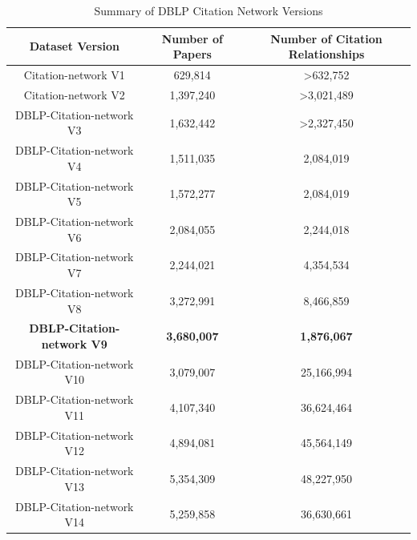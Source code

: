 \documentclass[11pt]{article}
\begin{document}
\begin{table}[h!]
	\centering
	\begin{tabular}{|c|c|c|}
		\hline
		\textbf{Dataset Version}          & \textbf{Number of Papers} & \textbf{Number of Citation Relationships} \\ \hline
		Citation-network V1               & 629,814                   & >632,752                                  \\ \hline
		Citation-network V2               & 1,397,240                 & >3,021,489                                \\ \hline
		DBLP-Citation-network V3          & 1,632,442                 & >2,327,450                                \\ \hline
		DBLP-Citation-network V4          & 1,511,035                 & 2,084,019                                 \\ \hline
		DBLP-Citation-network V5          & 1,572,277                 & 2,084,019                                 \\ \hline
		DBLP-Citation-network V6          & 2,084,055                 & 2,244,018                                 \\ \hline
		DBLP-Citation-network V7          & 2,244,021                 & 4,354,534                                 \\ \hline
		DBLP-Citation-network V8          & 3,272,991                 & 8,466,859                                 \\ \hline
		\textbf{DBLP-Citation-network V9} & \textbf{3,680,007}        & \textbf{1,876,067}                        \\ \hline
		DBLP-Citation-network V10         & 3,079,007                 & 25,166,994                                \\ \hline
		DBLP-Citation-network V11         & 4,107,340                 & 36,624,464                                \\ \hline
		DBLP-Citation-network V12         & 4,894,081                 & 45,564,149                                \\ \hline
		DBLP-Citation-network V13         & 5,354,309                 & 48,227,950                                \\ \hline
		DBLP-Citation-network V14         & 5,259,858                 & 36,630,661                                \\ \hline
	\end{tabular}
	\caption{Summary of DBLP Citation Network Versions}
	\label{tab:dblp_citation_networks}
\end{table}
\end{document}
